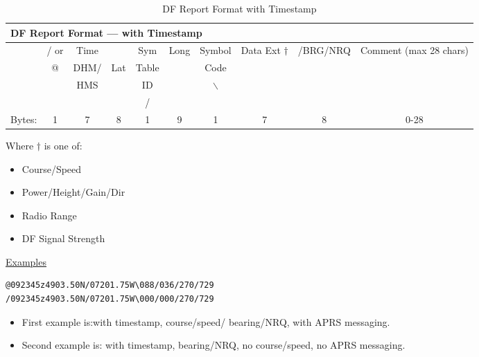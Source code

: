
\begin{table}[H]
  
  \begin{tabular}{r|c|c|c|c|c|c|c|c|c|}
    \hline
    \multicolumn{10}{l}{DF Report Format — with Timestamp} \\
    \hline 
    & / or & Time  &     & Sym    & Long & Symbol & Data Ext $\dagger$ & /BRG/NRQ  & Comment (max 28 chars) \\
    & @    & DHM/  & Lat & Table  &      & Code   &       &  & \\
    &      &  HMS  &     &   ID   &      &   $\backslash$    &       &  & \\
    &      &       &     &   /    &      &        &       & & \\
    
    \hline
    Bytes: & 1 & 7 & 8 & 1 & 9 & 1 & 7 & 8 & 0-28  \\
    \hline
        
  \end{tabular}
  \vspace{2em}
  
  Where $\dagger$ is one of:
  \begin{itemize}
  \item Course/Speed
  \item Power/Height/Gain/Dir
  \item Radio Range
  \item DF Signal Strength
  \end{itemize}

  \vspace {2em}
  
  \underline{Examples}
  \vspace{1em}
  
\begin{verbatim}
@092345z4903.50N/07201.75W\088/036/270/729
/092345z4903.50N/07201.75W\000/000/270/729
\end{verbatim}
\vspace {2em}

\begin{itemize}
\item First example is:with timestamp, course/speed/
bearing/NRQ, with APRS messaging.

\item Second example is: with timestamp, bearing/NRQ, no
course/speed, no APRS messaging.
\end{itemize}

  \doublerule
  \caption{DF Report Format with Timestamp}
\end{table}
